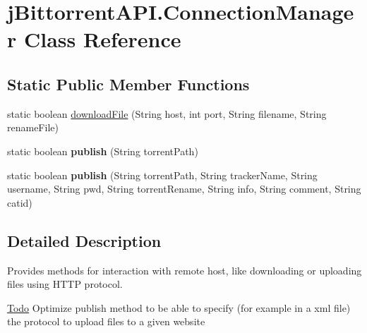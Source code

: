 \hypertarget{classj_bittorrent_a_p_i_1_1_connection_manager}{
\section{jBittorrentAPI.ConnectionManager Class Reference}
\label{classj_bittorrent_a_p_i_1_1_connection_manager}
}
\subsection*{Static Public Member Functions}
\begin{DoxyCompactItemize}
\item 
static boolean \hyperlink{classj_bittorrent_a_p_i_1_1_connection_manager_adaa7d85013828269c09037be26f8ea2e}{downloadFile} (String host, int port, String filename, String renameFile)
\item 
\hypertarget{classj_bittorrent_a_p_i_1_1_connection_manager_a2d5d9008289e518db88841b11933e68b}{
static boolean {\bfseries publish} (String torrentPath)}
\label{classj_bittorrent_a_p_i_1_1_connection_manager_a2d5d9008289e518db88841b11933e68b}

\item 
\hypertarget{classj_bittorrent_a_p_i_1_1_connection_manager_aeb957819a76ee0dd198933021b4af982}{
static boolean {\bfseries publish} (String torrentPath, String trackerName, String username, String pwd, String torrentRename, String info, String comment, String catid)}
\label{classj_bittorrent_a_p_i_1_1_connection_manager_aeb957819a76ee0dd198933021b4af982}

\end{DoxyCompactItemize}


\subsection{Detailed Description}
Provides methods for interaction with remote host, like downloading or uploading files using HTTP protocol. \begin{Desc}
\item[\hyperlink{todo__todo000001}{Todo}]Optimize publish method to be able to specify (for example in a xml file) the protocol to upload files to a given website \end{Desc}


